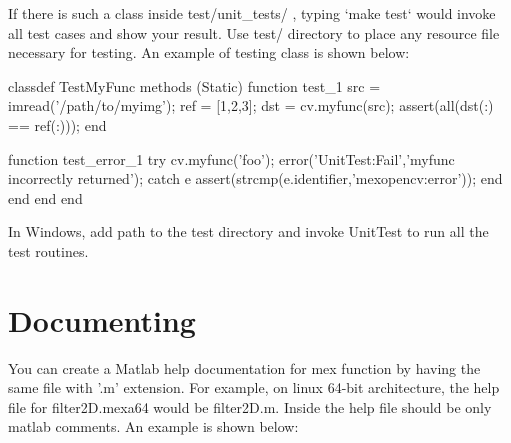 \-If there is such a class inside {\ttfamily test/unit\-\_\-tests/} , typing `make test` would invoke all test cases and show your result. \-Use {\ttfamily test/} directory to place any resource file necessary for testing. \-An example of testing class is shown below\-:


\begin{DoxyCode}
    classdef TestMyFunc
        methods (Static)
            function test_1
                src = imread('/path/to/myimg');
                ref = [1,2,3];                  %
                dst = cv.myfunc(src);           %
                assert(all(dst(:) == ref(:)));  %
            end
            
            function test_error_1
                try
                    cv.myfunc('foo');           %
                    error('UnitTest:Fail','myfunc incorrectly returned');
                catch e
                    assert(strcmp(e.identifier,'mexopencv:error'));
                end
            end
        end
    end
\end{DoxyCode}


\-In \-Windows, add path to the {\ttfamily test} directory and invoke {\ttfamily \-Unit\-Test} to run all the test routines.\hypertarget{index_documenting}{}\section{\-Documenting}\label{index_documenting}
\-You can create a \-Matlab help documentation for mex function by having the same file with '.m' extension. \-For example, on linux 64-\/bit architecture, the help file for {\ttfamily filter2\-D.\-mexa64} would be {\ttfamily filter2\-D.\-m}. \-Inside the help file should be only matlab comments. \-An example is shown below\-:


\begin{DoxyCode}
\end{DoxyCode}
 